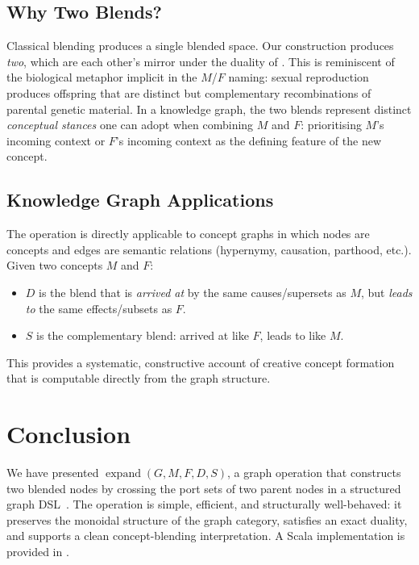 \documentclass[11pt, a4paper]{article}
\theoremstyle{definition}
\theoremstyle{plain}
\theoremstyle{remark}
\newcommand{\expand}{\operatorname{expand}}
\begin{document}
\subsection{Why Two Blends?}

Classical blending produces a single blended space.  Our construction produces
\emph{two}, which are each other's mirror under the duality of
.  This is reminiscent of the biological metaphor implicit
in the $M$/$F$ naming: sexual reproduction produces offspring that are distinct
but complementary recombinations of parental genetic material.  In a knowledge
graph, the two blends represent distinct \emph{conceptual stances} one can
adopt when combining $M$ and $F$: prioritising $M$'s incoming context or $F$'s
incoming context as the defining feature of the new concept.

\subsection{Knowledge Graph Applications}

The operation is directly applicable to concept graphs in which nodes are
concepts and edges are semantic relations (hypernymy, causation, parthood,
etc.).  Given two concepts $M$ and $F$:
\begin{itemize}[leftmargin=2em]
  \item $D$ is the blend that is \emph{arrived at} by the same causes/supersets
    as $M$, but \emph{leads to} the same effects/subsets as $F$.
  \item $S$ is the complementary blend: arrived at like $F$, leads to like $M$.
\end{itemize}
This provides a systematic, constructive account of creative concept formation
that is computable directly from the graph structure.

\section{Conclusion}
\label{sec:conclusion}

We have presented $\expand(G, M, F, D, S)$, a graph operation that constructs
two blended nodes by crossing the port sets of two parent nodes in a structured
graph DSL~\cite{meredith2025gist}.  The operation is simple, efficient, and
structurally well-behaved: it preserves the monoidal structure of the graph
category, satisfies an exact duality, and supports a clean concept-blending
interpretation.  A Scala implementation is provided in .
\end{document}
